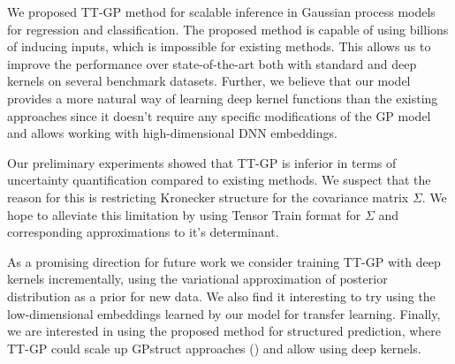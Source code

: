 
We proposed TT-GP method for scalable inference in Gaussian process models
for regression and classification.  The proposed method is capable of using
billions of inducing inputs, which is impossible for existing methods. This allows us to improve the
performance over state-of-the-art both with standard and deep kernels
on several benchmark datasets.
Further, we believe that our model provides a more natural way of learning deep
kernel functions than the existing approaches since it doesn't require any
specific modifications of the GP model and allows working with high-dimensional
DNN embeddings.
 
Our preliminary experiments showed that TT-GP is inferior in terms of
uncertainty quantification compared to existing methods. We suspect that the
reason for this is restricting Kronecker structure for the covariance matrix $\Sigma$. 
We hope to alleviate this limitation by using Tensor Train format for $\Sigma$ 
and corresponding approximations to it's determinant.

As a promising direction for future work we consider training TT-GP
with deep kernels incrementally, using the variational approximation
of posterior distribution as a prior for new data. We also find it interesting
to try using the low-dimensional embeddings learned by our model for transfer 
learning. Finally, we are interested in using the proposed method for structured prediction,
where TT-GP could scale up GPstruct approaches (\citet{bratieres2015}) and allow using
deep kernels. 

